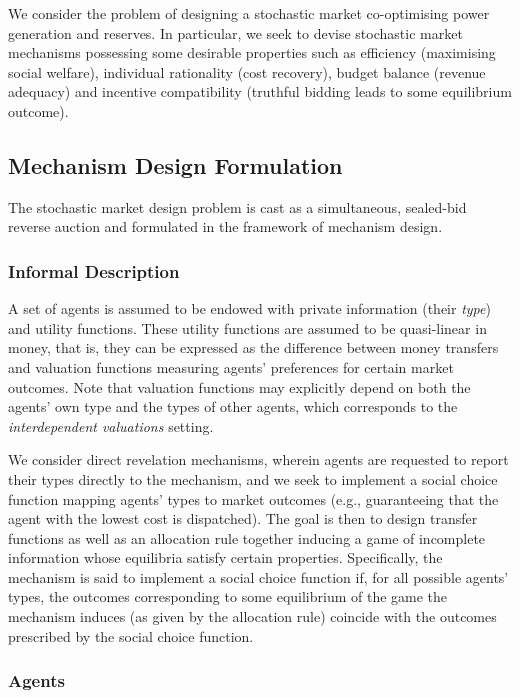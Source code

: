 \documentclass{article}
\begin{document}
We consider the problem of designing a stochastic market co-optimising power generation and reserves. In particular, we seek to devise stochastic market mechanisms possessing some desirable properties such as efficiency (maximising social welfare), individual rationality (cost recovery), budget balance (revenue adequacy) and incentive compatibility (truthful bidding leads to some equilibrium outcome).

\subsection{Mechanism Design Formulation}

The stochastic market design problem is cast as a simultaneous, sealed-bid reverse auction and formulated in the framework of mechanism design. 

\subsubsection{Informal Description}

A set of agents is assumed to be endowed with private information (their \textit{type}) and utility functions. These utility functions are assumed to be quasi-linear in money, that is, they can be expressed as the difference between money transfers and valuation functions measuring agents' preferences for certain market outcomes. Note that valuation functions may explicitly depend on both the agents' own type and the types of other agents, which corresponds to the \textit{interdependent valuations} setting.

We consider direct revelation mechanisms, wherein agents are requested to report their types directly to the mechanism, and we seek to implement a social choice function mapping agents' types to market outcomes (e.g., guaranteeing that the agent with the lowest cost is dispatched). The goal is then to design transfer functions as well as an allocation rule together inducing a game of incomplete information whose equilibria satisfy certain properties. Specifically, the mechanism is said to implement a social choice function if, for all possible agents' types, the outcomes corresponding to some equilibrium of the game the mechanism induces (as given by the allocation rule) coincide with the outcomes prescribed by the social choice function.

\subsubsection{Agents}
\end{document}
